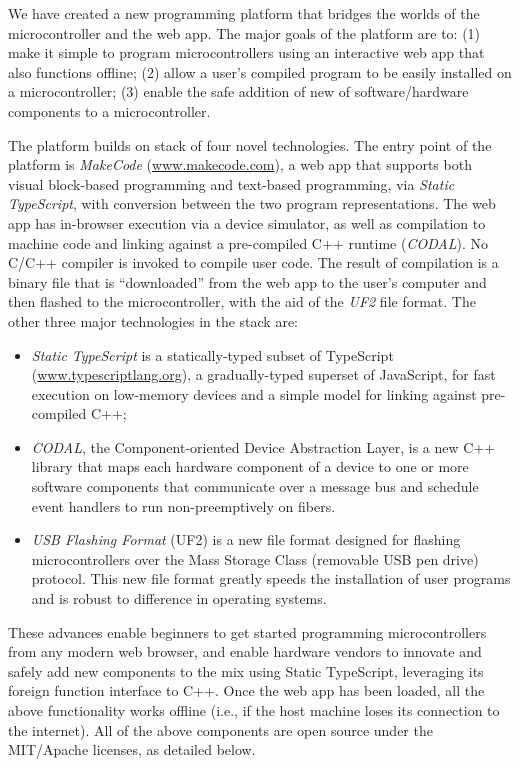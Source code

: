We have created a new programming platform that bridges the worlds of the microcontroller
and the web app. The major goals of the platform are to: (1)
make it simple to program microcontrollers using an interactive web app that also functions offline;
(2) allow a user's compiled program to be easily installed on a microcontroller;
(3) enable the safe addition of new of software/hardware components to a microcontroller.

The platform builds on stack of four novel technologies.
The entry point of the platform is \emph{MakeCode} (\url{www.makecode.com}),
a web app that supports both visual block-based programming and text-based programming,
via \emph{Static TypeScript}, with conversion 
between the two program representations. The web app has in-browser execution 
via a device simulator, as well as compilation to machine code and linking against a 
pre-compiled C++ runtime (\emph{CODAL}). No C/C++ compiler is invoked to compile user code. 
The result of compilation is a binary file that is ``downloaded'' from the web app to the user's 
computer and then flashed to the microcontroller, with the aid of the \emph{UF2} file format.
The other three major technologies in the stack are:
\begin{itemize}

\item \emph{Static TypeScript} is a statically-typed subset of TypeScript (\url{www.typescriptlang.org}), 
a gradually-typed superset of JavaScript, for fast execution on low-memory devices 
and a simple model for linking against pre-compiled C++; 

\item \emph{CODAL}, the Component-oriented Device Abstraction Layer, is a new C++ library that maps 
each hardware component of a device to one or more software components that communicate over a message bus and
schedule event handlers to run non-preemptively on fibers. 

\item \emph{USB Flashing Format} (UF2) is a new file format designed for flashing microcontrollers over the Mass Storage
Class (removable USB pen drive) protocol.  This new file format greatly speeds the installation of user programs
and is robust to difference in operating systems.
\end{itemize}
These advances enable beginners to get started programming microcontrollers from any modern web browser, and enable
hardware vendors to innovate and safely add new components to the mix using Static TypeScript, leveraging its
foreign function interface to C++. Once the web app has been loaded, 
all the above functionality works offline (i.e., if the host machine loses its connection 
to the internet).
All of the above components are open source under the MIT/Apache licenses, as detailed below. 

